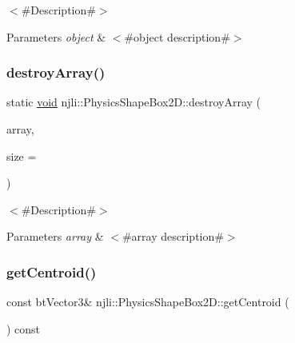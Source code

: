 $<$\#\+Description\#$>$


\begin{DoxyParams}{Parameters}
{\em object} & $<$\#object description\#$>$ \\
\hline
\end{DoxyParams}
\mbox{\label{classnjli_1_1_physics_shape_box2_d_ac9aadd4b0efeab6c170ad3f37ad8cf40}} 
\subsubsection{\texorpdfstring{destroy\+Array()}{destroyArray()}}
{\footnotesize\ttfamily static \mbox{\hyperlink{_thread_8h_af1e856da2e658414cb2456cb6f7ebc66}{void}} njli\+::\+Physics\+Shape\+Box2\+D\+::destroy\+Array (\begin{DoxyParamCaption}\item[{\mbox{\hyperlink{classnjli_1_1_physics_shape_box2_d}{Physics\+Shape\+Box2D}} $\ast$$\ast$}]{array,  }\item[{const \mbox{\hyperlink{_util_8h_a10e94b422ef0c20dcdec20d31a1f5049}{u32}}}]{size = {} }\end{DoxyParamCaption})\hspace{0.3cm}{\ttfamily [static]}}

$<$\#\+Description\#$>$


\begin{DoxyParams}{Parameters}
{\em array} & $<$\#array description\#$>$ \\
\hline
\end{DoxyParams}
\mbox{\label{classnjli_1_1_physics_shape_box2_d_aa4e53789b8520050a5c84c7ad6ad3489}} 
\subsubsection{\texorpdfstring{get\+Centroid()}{getCentroid()}}
{\footnotesize\ttfamily const bt\+Vector3\& njli\+::\+Physics\+Shape\+Box2\+D\+::get\+Centroid (\begin{DoxyParamCaption}{ }\end{DoxyParamCaption}) const}

